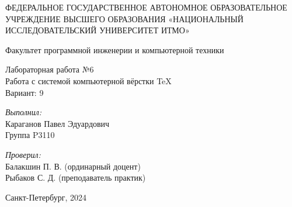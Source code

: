 
    \begin{center}
    \Large ФЕДЕРАЛЬНОЕ ГОСУДАРСТВЕННОЕ АВТОНОМНОЕ ОБРАЗОВАТЕЛЬНОЕ УЧРЕЖДЕНИЕ ВЫСШЕГО ОБРАЗОВАНИЯ 
«НАЦИОНАЛЬНЫЙ ИССЛЕДОВАТЕЛЬСКИЙ УНИВЕРСИТЕТ ИТМО»

    
    Факультет программной инженерии и компьютерной техники\\
    \hfill 
    
    \vspace{7cm}
    \Large Лабораторная работа №6 \\
    Работа с системой компьютерной вёрстки \TeX\\
    Вариант: 9\\
    \end{center}
    
    \vspace{6.5cm}
     
    \begin{flushright}
    \textit{Выполнил:}\\
    Караганов Павел Эдуардович\\
    Группа P3110\
    
    \textit{Проверил:}\\
    Балакшин П. В. (ординарный доцент)\\
    Рыбаков С. Д. (преподаватель  практик)\\
    \end{flushright}
     
    \vfill
    
    \begin{center} Санкт-Петербург, 2024 \end{center}
    \newpage